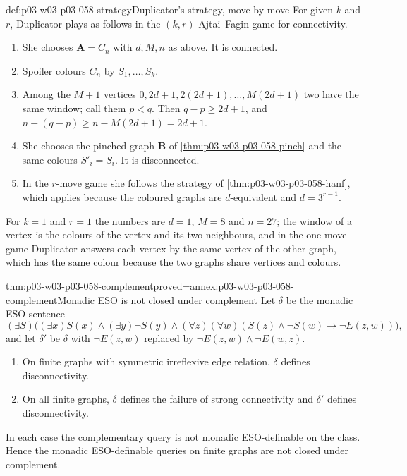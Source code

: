 \begin{hbexample}{def:p03-w03-p03-058-strategy}{Duplicator's strategy, move by move}
For given \(k\) and \(r\), Duplicator plays as follows in the
\((k,r)\)-Ajtai--Fagin game for connectivity.
\begin{enumerate}
\item She chooses \(\mathbf A=C_n\) with \(d,M,n\) as above. It is connected.
\item Spoiler colours \(C_n\) by \(S_1,\ldots,S_k\).
\item Among the \(M+1\) vertices \(0,2d+1,2(2d+1),\ldots,M(2d+1)\) two have
      the same window; call them \(p<q\). Then \(q-p\ge2d+1\), and
      \(n-(q-p)\ge n-M(2d+1)=2d+1\).
\item She chooses the pinched graph \(\mathbf B\) of
      \cref{thm:p03-w03-p03-058-pinch} and the same colours
      \(S'_i=S_i\). It is disconnected.
\item In the \(r\)-move game she follows the strategy of
      \cref{thm:p03-w03-p03-058-hanf}, which applies because the coloured
      graphs are \(d\)-equivalent and \(d=3^{r-1}\).
\end{enumerate}
For \(k=1\) and \(r=1\) the numbers are \(d=1\), \(M=8\) and \(n=27\); the
window of a vertex is the colours of the vertex and its two neighbours, and
in the one-move game Duplicator answers each vertex by the same vertex of
the other graph, which has the same colour because the two graphs share
vertices and colours.
\end{hbexample}

\begin{hbcorollary}{thm:p03-w03-p03-058-complement}{proved=annex:p03-w03-p03-058-complement}{Monadic ESO is not closed under complement}
Let \(\delta\) be the monadic ESO-sentence
\[
 (\exists S)\bigl((\exists x)S(x)\wedge(\exists y)\neg S(y)\wedge
 (\forall z)(\forall w)(S(z)\wedge\neg S(w)\to\neg E(z,w))\bigr),
\]
and let \(\delta'\) be \(\delta\) with \(\neg E(z,w)\) replaced by
\(\neg E(z,w)\wedge\neg E(w,z)\).
\begin{enumerate}
\item On finite graphs with symmetric irreflexive edge relation, \(\delta\)
      defines disconnectivity.
\item On all finite graphs, \(\delta\) defines the failure of strong
      connectivity and \(\delta'\) defines disconnectivity.
\end{enumerate}
In each case the complementary query is not monadic ESO-definable on the
class. Hence the monadic ESO-definable queries on finite graphs are not
closed under complement.
\end{hbcorollary}

